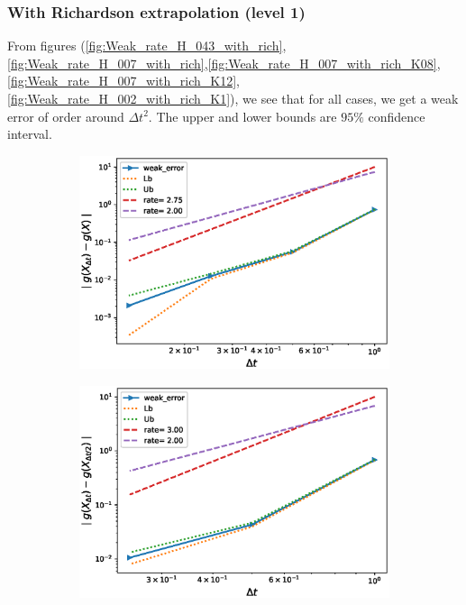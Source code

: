 \documentclass[11pt]{article}
\begin{document}
\subsubsection{With Richardson extrapolation (level 1)}
From figures (\ref{fig:Weak_rate_H_043_with_rich}, \ref{fig:Weak_rate_H_007_with_rich},\ref{fig:Weak_rate_H_007_with_rich_K08}, \ref{fig:Weak_rate_H_007_with_rich_K12}, \ref{fig:Weak_rate_H_002_with_rich_K1}), we see that for all cases, we get a weak error of order around $\Delta t^2$. The upper and lower bounds are $95\%$ confidence interval.
\begin{figure}[h!]
	\centering
	\begin{subfigure}{.4\textwidth}
		\centering
		\includegraphics[width=1\linewidth]{./figures/rBergomi_weak_error_rates/with_richardson/H_043/weak_convergence_order_Bergomi_H_043_K_1_M_10_6_richardson_relative}
		\caption{}
		\label{fig:sub3}
	\end{subfigure}%
	\begin{subfigure}{.4\textwidth}
		\centering
		\includegraphics[width=1\linewidth]{./figures/rBergomi_weak_error_rates/with_richardson/H_043/weak_convergence_order_differences_Bergomi_H_043_K_1_M_10_6_richardson_relative}
		\caption{}
		\label{fig:sub4}
	\end{subfigure}
	

\end{figure}
\end{document}
